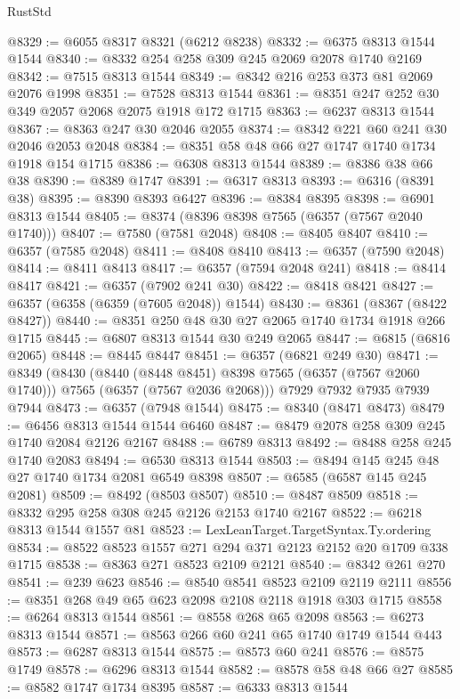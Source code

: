 \begin{lexlean}{RustStd}
\begin{coremodule}
@8329 := @6055 @8317 @8321 (@6212 @8238)
@8332 := @6375 @8313 @1544 @1544
@8340 := @8332 @254 @258 @309 @245 @2069 @2078 @1740 @2169
@8342 := @7515 @8313 @1544
@8349 := @8342 @216 @253 @373 @81 @2069 @2076 @1998
@8351 := @7528 @8313 @1544
@8361 := @8351 @247 @252 @30 @349 @2057 @2068 @2075 @1918 @172 @1715
@8363 := @6237 @8313 @1544
@8367 := @8363 @247 @30 @2046 @2055
@8374 := @8342 @221 @60 @241 @30 @2046 @2053 @2048
@8384 := @8351 @58 @48 @66 @27 @1747 @1740 @1734 @1918 @154 @1715
@8386 := @6308 @8313 @1544
@8389 := @8386 @38 @66 @38
@8390 := @8389 @1747
@8391 := @6317 @8313
@8393 := @6316 (@8391 @38)
@8395 := @8390 @8393 @6427
@8396 := @8384 @8395
@8398 := @6901 @8313 @1544
@8405 := @8374 (@8396 @8398 @7565 (@6357 (@7567 @2040 @1740)))
@8407 := @7580 (@7581 @2048)
@8408 := @8405 @8407
@8410 := @6357 (@7585 @2048)
@8411 := @8408 @8410
@8413 := @6357 (@7590 @2048)
@8414 := @8411 @8413
@8417 := @6357 (@7594 @2048 @241)
@8418 := @8414 @8417
@8421 := @6357 (@7902 @241 @30)
@8422 := @8418 @8421
@8427 := @6357 (@6358 (@6359 (@7605 @2048)) @1544)
@8430 := @8361 (@8367 (@8422 @8427))
@8440 := @8351 @250 @48 @30 @27 @2065 @1740 @1734 @1918 @266 @1715
@8445 := @6807 @8313 @1544 @30 @249 @2065
@8447 := @6815 (@6816 @2065)
@8448 := @8445 @8447
@8451 := @6357 (@6821 @249 @30)
@8471 := @8349
    (@8430
      (@8440 (@8448 @8451) @8398 @7565 (@6357 (@7567 @2060 @1740)))
      @7565
      (@6357 (@7567 @2036 @2068)))
    @7929
    @7932
    @7935
    @7939
    @7944
@8473 := @6357 (@7948 @1544)
@8475 := @8340 (@8471 @8473)
@8479 := @6456 @8313 @1544 @1544 @6460
@8487 := @8479 @2078 @258 @309 @245 @1740 @2084 @2126 @2167
@8488 := @6789 @8313
@8492 := @8488 @258 @245 @1740 @2083
@8494 := @6530 @8313 @1544
@8503 := @8494 @145 @245 @48 @27 @1740 @1734 @2081 @6549 @8398
@8507 := @6585 (@6587 @145 @245 @2081)
@8509 := @8492 (@8503 @8507)
@8510 := @8487 @8509
@8518 := @8332 @295 @258 @308 @245 @2126 @2153 @1740 @2167
@8522 := @6218 @8313 @1544 @1557 @81
@8523 := LexLeanTarget.TargetSyntax.Ty.ordering
@8534 := @8522 @8523 @1557 @271 @294 @371 @2123 @2152 @20 @1709 @338 @1715
@8538 := @8363 @271 @8523 @2109 @2121
@8540 := @8342 @261 @270
@8541 := @239 @623
@8546 := @8540 @8541 @8523 @2109 @2119 @2111
@8556 := @8351 @268 @49 @65 @623 @2098 @2108 @2118 @1918 @303 @1715
@8558 := @6264 @8313 @1544
@8561 := @8558 @268 @65 @2098
@8563 := @6273 @8313 @1544
@8571 := @8563 @266 @60 @241 @65 @1740 @1749 @1544 @443
@8573 := @6287 @8313 @1544
@8575 := @8573 @60 @241
@8576 := @8575 @1749
@8578 := @6296 @8313 @1544
@8582 := @8578 @58 @48 @66 @27
@8585 := @8582 @1747 @1734 @8395
@8587 := @6333 @8313 @1544

\end{coremodule}
\end{lexlean}
